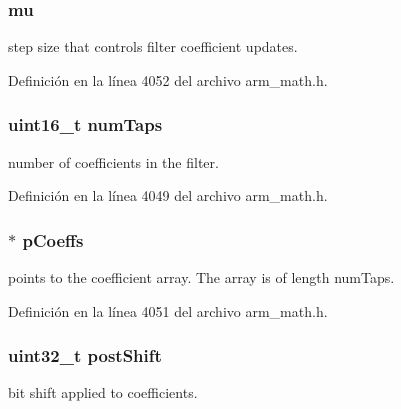\subsubsection[{\texorpdfstring{mu}{mu}}]{ mu}\hypertarget{structarm__lms__instance__q15_aab4745770bd667de040227eec1b5ff8d}{}\label{structarm__lms__instance__q15_aab4745770bd667de040227eec1b5ff8d}
step size that controls filter coefficient updates. 

Definición en la línea 4052 del archivo arm\+\_\+math.\+h.

\subsubsection[{\texorpdfstring{num\+Taps}{numTaps}}]{\setlength{\rightskip}{0pt plus 5cm}uint16\+\_\+t num\+Taps}\hypertarget{structarm__lms__instance__q15_a751941891e47f522a7f5375fe8990aac}{}\label{structarm__lms__instance__q15_a751941891e47f522a7f5375fe8990aac}
number of coefficients in the filter. 

Definición en la línea 4049 del archivo arm\+\_\+math.\+h.

\subsubsection[{\texorpdfstring{p\+Coeffs}{pCoeffs}}]{$\ast$ p\+Coeffs}\hypertarget{structarm__lms__instance__q15_a7ca181a37f714d174445f486bebce26f}{}\label{structarm__lms__instance__q15_a7ca181a37f714d174445f486bebce26f}
points to the coefficient array. The array is of length num\+Taps. 

Definición en la línea 4051 del archivo arm\+\_\+math.\+h.

\subsubsection[{\texorpdfstring{post\+Shift}{postShift}}]{\setlength{\rightskip}{0pt plus 5cm}uint32\+\_\+t post\+Shift}\hypertarget{structarm__lms__instance__q15_aa2cacddfc5e1d86905d7d31a18b1979b}{}\label{structarm__lms__instance__q15_aa2cacddfc5e1d86905d7d31a18b1979b}
bit shift applied to coefficients. 

